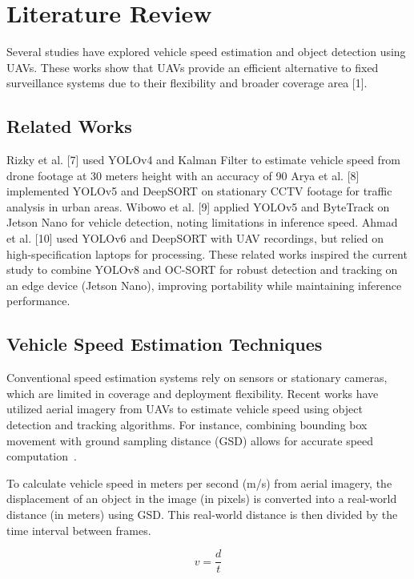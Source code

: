 \section{Literature Review}
\label{sec:literaturreview}


Several studies have explored vehicle speed estimation and object detection using UAVs. These works show that UAVs provide an efficient alternative to fixed surveillance systems due to their flexibility and broader coverage area [1].

\subsection{Related Works}
Rizky et al. [7] used YOLOv4 and Kalman Filter to estimate vehicle speed from drone footage at 30 meters height with an accuracy of 90%
Arya et al. [8] implemented YOLOv5 and DeepSORT on stationary CCTV footage for traffic analysis in urban areas.
Wibowo et al. [9] applied YOLOv5 and ByteTrack on Jetson Nano for vehicle detection, noting limitations in inference speed.
Ahmad et al. [10] used YOLOv6 and DeepSORT with UAV recordings, but relied on high-specification laptops for processing.
These related works inspired the current study to combine YOLOv8 and OC-SORT for robust detection and tracking on an edge device (Jetson Nano), improving portability while maintaining inference performance.

\subsection{Vehicle Speed Estimation Techniques}
Conventional speed estimation systems rely on sensors or stationary cameras, which are limited in coverage and deployment flexibility. Recent works have utilized aerial imagery from UAVs to estimate vehicle speed using object detection and tracking algorithms. For instance, combining bounding box movement with ground sampling distance (GSD) allows for accurate speed computation~\cite{ref2}.

To calculate vehicle speed in meters per second (m/s) from aerial imagery, the displacement of an object in the image (in pixels) is converted into a real-world distance (in meters) using GSD. This real-world distance is then divided by the time interval between frames.

\begin{equation}
    v = \frac{d}{t}
    \label{eq:speed_basic}
\end{equation}

